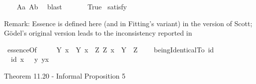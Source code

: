 \begin{isabellebody}
%
\isadelimproof
\ \ %
\endisadelimproof
%
\isatagproof
{}\isamarkupfalse%
\ A{}a\ A{}b\ \isamarkupfalse%
\ blast\ %
%
\endisatagproof
{\isafoldproof}%
%
\isadelimproof
\isanewline
%
\endisadelimproof
\ \ \ \ \isanewline
{}\isamarkupfalse%
\ True\ \isamarkupfalse%
{\isacharbrackleft}satisfy{\isacharbrackright}%
\isadelimproof
\ %
\endisadelimproof
%
\isatagproof
{}\isamarkupfalse%
\ %
%
\endisatagproof
{\isafoldproof}%
%
\isadelimproof
%
\endisadelimproof
%
\begin{isamarkuptext}%
\bigbreak%
\end{isamarkuptext}\isamarkuptrue%
%
\isamarkuptrue%
%
\begin{isamarkuptext}%
Remark: Essence is defined here (and in Fitting's variant) in the version of Scott; G\"odel's original version leads to the inconsistency
 reported in \cite{C55,C60}%
\end{isamarkuptext}\isamarkuptrue%
\isamarkupfalse%
\ essenceOf{\isacharcolon}{\isacharcolon}{\isachardoublequoteopen}{\isasymup}{\isasymlangle}{\isasymup}{\isasymlangle}{\isasymzero}{\isasymrangle}{\isacharcomma}{\isasymzero}{\isasymrangle}{\isachardoublequoteclose}\ {\isacharparenleft}{\isachardoublequoteopen}{\isasymE}{\isachardoublequoteclose}{\isacharparenright}\ \isanewline
\ \ {\isachardoublequoteopen}{\isasymE}\ Y\ x\ {\isasymequiv}\ {\isacharparenleft}Y\ x{\isacharparenright}\ \isactrlbold {\isasymand}\ {\isacharparenleft}\isactrlbold {\isasymforall}Z{\isachardot}\ Z\ x\ \isactrlbold {\isasymrightarrow}\ Y\ {\isasymRrightarrow}\ Z{\isacharparenright}{\isachardoublequoteclose}\ \ \ \isanewline
{}\isamarkupfalse%
\ beingIdenticalTo{\isacharcolon}{\isacharcolon}{\isachardoublequoteopen}{\isasymzero}{\isasymRightarrow}{\isasymup}{\isasymlangle}{\isasymzero}{\isasymrangle}{\isachardoublequoteclose}\ {\isacharparenleft}{\isachardoublequoteopen}id{\isachardoublequoteclose}{\isacharparenright}\ \isanewline
\ \ {\isachardoublequoteopen}id\ x\ \ {\isasymequiv}\ {\isacharparenleft}{\isasymlambda}y{\isachardot}\ y\isactrlbold {\isasymapprox}x{\isacharparenright}{\isachardoublequoteclose}\ \ %
%
\begin{isamarkuptext}%
Theorem 11.20 - Informal Proposition 5%

\end{isamarkuptext}
\end{isabellebody}
